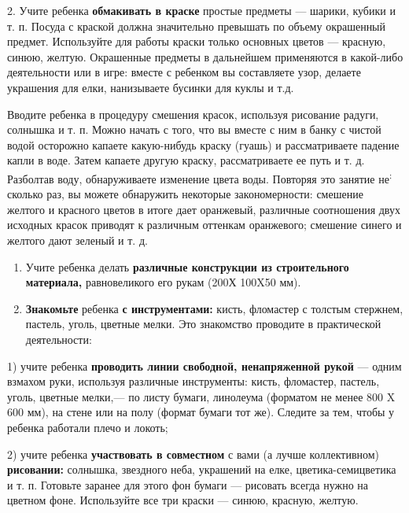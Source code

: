 \documentclass{book}
\begin{document}
2. Учите ребенка \textbf{обмакивать в краске} простые предметы ---
шарики, кубики и т. п. Посуда с краской должна значительно превышать по
объему окрашенный предмет. Используйте для работы краски только основных
цветов --- красную, синюю, желтую. Окрашенные предметы в дальнейшем
применяются в какой-либо деятельности или в игре: вместе с ребенком вы
составляете узор, делаете украшения для елки, нанизываете бусинки для
куклы и т.д.

Вводите ребенка в процедуру смешения красок, используя рисование радуги,
солнышка и т. п. Можно начать с того, что вы вместе с ним в банку с
чистой водой осторожно капаете какую-нибудь краску (гуашь) и
рассматриваете падение капли в воде. Затем капаете другую краску,
рассматриваете ее путь и т. д. Разболтав воду, обнаруживаете изменение
цвета воды. Повторяя это занятие не\textsuperscript{:} сколько раз, вы
можете обнаружить некоторые закономерности: смешение желтого и красного
цветов в итоге дает оранжевый, различные соотношения двух исходных
красок приводят к различным оттенкам оранжевого; смешение синего и
желтого дают зеленый и т. д.


\begin{enumerate}
\def\labelenumi{\arabic{enumi}.}
\setcounter{enumi}{2}
\item
  
  Учите ребенка делать \textbf{различные конструкции из строительного
  материала,} равновеликого его рукам (200Х 100X50 мм).
  
\item
  
  \textbf{Знакомьте} ребенка \textbf{с инструментами:} кисть, фломастер
  с толстым стержнем, пастель, уголь, цветные мелки. Это знакомство
  проводите в практической деятельности:
  
\end{enumerate}


1) учите ребенка \textbf{проводить линии свободной, ненапряженной рукой}
--- одним взмахом руки, используя различные инструменты: кисть,
фломастер, пастель, уголь, цветные мелки,--- по листу бумаги, линолеума
(форматом не менее 800 X 600 мм), на стене или на полу (формат бумаги
тот же). Следите за тем, чтобы у ребенка работали плечо и локоть;

2) учите ребенка \textbf{участвовать в совместном} с вами (а лучше
коллективном) \textbf{рисовании:} солнышка, звездного неба, украшений на
елке, цветика-семицветика и т. п. Готовьте заранее для этого фон бумаги
--- рисовать всегда нужно на цветном фоне. Используйте все три краски
--- синюю, красную, желтую.
\end{document}

